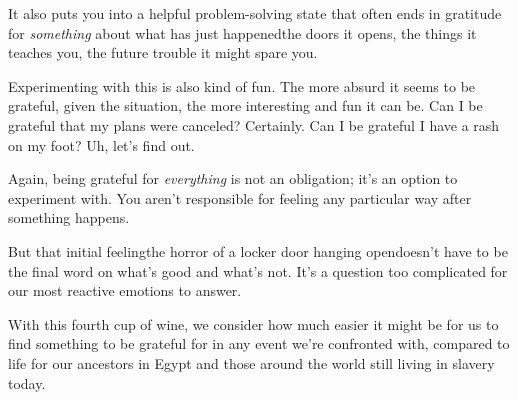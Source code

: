 {  It also puts you into a helpful problem-solving state that often ends in
  gratitude for \textit{something} about what has just happened\textemdash{}the
  doors it opens, the things it teaches you, the future trouble it might spare
  you.

  \newReading Experimenting with this is also kind of fun. The more absurd it
  seems to be grateful, given the situation, the more interesting and fun it can
  be. Can I be grateful that my plans were canceled? Certainly. Can I be
  grateful I have a rash on my foot? Uh, let's find out.

  Again, being grateful for \textit{everything} is not an obligation; it's an
  option to experiment with. You aren't responsible for feeling any particular
  way after something happens.

  But that initial feeling\textemdash{}the horror of a locker door hanging
  open\textemdash{}doesn't have to be the final word on what's good and what's
  not. It's a question too complicated for our most reactive emotions to answer.

  With this fourth cup of wine, we consider how much easier it might be for us
  to find something to be grateful for in any event we're confronted with,
  compared to life for our ancestors in Egypt and those around the world still
  living in slavery today.
}
